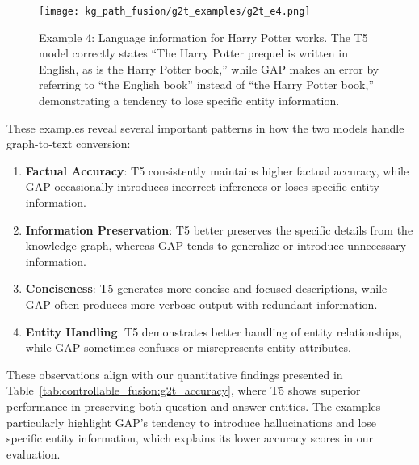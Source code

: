 \begin{figure}[!htb]
    \centering
    \texttt{[image: kg\_path\_fusion/g2t\_examples/g2t\_e4.png]}
    \caption{Example 4: Language information for Harry Potter works. The T5 model correctly states ``The Harry Potter prequel is written in English, as is the Harry Potter book,'' while GAP makes an error by referring to ``the English book'' instead of ``the Harry Potter book,'' demonstrating a tendency to lose specific entity information.}
    \label{fig:controllable_fusion:g2t_example4}
\end{figure}

These examples reveal several important patterns in how the two models handle graph-to-text conversion:

\begin{enumerate}
    \item \textbf{Factual Accuracy}: T5 consistently maintains higher factual accuracy, while GAP occasionally introduces incorrect inferences or loses specific entity information.
    
    \item \textbf{Information Preservation}: T5 better preserves the specific details from the knowledge graph, whereas GAP tends to generalize or introduce unnecessary information.
    
    \item \textbf{Conciseness}: T5 generates more concise and focused descriptions, while GAP often produces more verbose output with redundant information.
    
    \item \textbf{Entity Handling}: T5 demonstrates better handling of entity relationships, while GAP sometimes confuses or misrepresents entity attributes.
\end{enumerate}

These observations align with our quantitative findings presented in Table~\ref{tab:controllable_fusion:g2t_accuracy}, where T5 shows superior performance in preserving both question and answer entities. The examples particularly highlight GAP's tendency to introduce hallucinations and lose specific entity information, which explains its lower accuracy scores in our evaluation.



